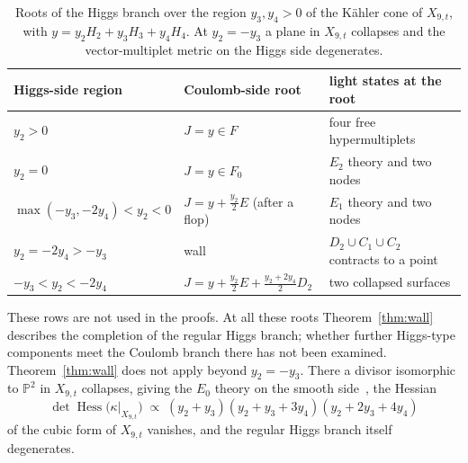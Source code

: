\begin{table}[t]
\centering\small
\begin{tabular}{lll}
\toprule
Higgs-side region & Coulomb-side root & light states at the root\\
\midrule
$y_2>0$ & $J=y\in F$ & four free hypermultiplets\\
$y_2=0$ & $J=y\in F_0$ & $E_2$ theory and two nodes\\
$\max(-y_3,-2y_4)<y_2<0$ & $J=y+\tfrac{y_2}2E$ (after a flop) & $E_1$ theory and two nodes\\
$y_2=-2y_4>-y_3$ & wall & $D_2\cup C_1\cup C_2$ contracts to a point\\
$-y_3<y_2<-2y_4$ & $J=y+\tfrac{y_2}2E+\tfrac{y_2+2y_4}2D_2$ & two collapsed surfaces\\
\bottomrule
\end{tabular}
\caption{Roots of the Higgs branch over the region $y_3,y_4>0$ of the K\"ahler cone of
$X_{9,t}$, with $y=y_2H_2+y_3H_3+y_4H_4$. At $y_2=-y_3$ a plane in $X_{9,t}$ collapses and the
vector-multiplet metric on the Higgs side degenerates.}
\label{tab:roots}
\end{table}

These rows are not used in the proofs. At all these roots Theorem~\ref{thm:wall} describes the
completion of the regular Higgs branch; whether further Higgs-type components meet the Coulomb
branch there has not been examined. Theorem~\ref{thm:wall} does not apply beyond $y_2=-y_3$. There
a divisor isomorphic to $\mathbb P^2$ in $X_{9,t}$ collapses, giving the $E_0$ theory on the
smooth side~\cite{W26quantum}, the Hessian
\begin{equation}
 \det\operatorname{Hess}\bigl(\kappa|_{X_{9,t}}\bigr)\;\propto\;
 (y_2+y_3)(y_2+y_3+3y_4)(y_2+2y_3+4y_4)
 \label{eq:hess}
\end{equation}
of the cubic form of $X_{9,t}$ vanishes, and the regular Higgs branch itself degenerates.

